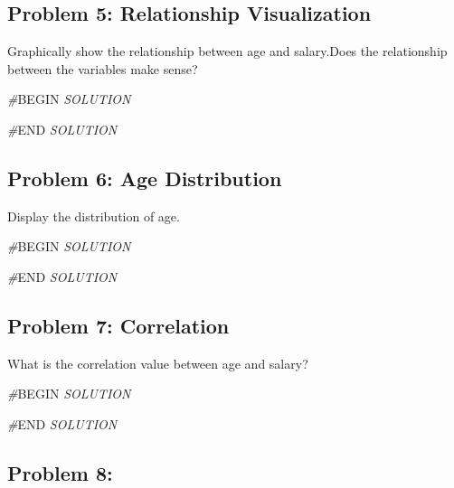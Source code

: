 \documentclass[
]{article}
\newenvironment{Shaded}{\begin{snugshade}}{\end{snugshade}}
\newcommand{\CommentTok}[1]{\textcolor[rgb]{0.56,0.35,0.01}{\textit{#1}}}
\newcommand{\RegionMarkerTok}[1]{#1}
\begin{document}
\hypertarget{problem-5-relationship-visualization}{%
\subsection{Problem 5: Relationship
Visualization}\label{problem-5-relationship-visualization}}

Graphically show the relationship between age and salary.Does the
relationship between the variables make sense?

\begin{Shaded}
\begin{Highlighting}[]
\CommentTok{\#}\RegionMarkerTok{BEGIN}\CommentTok{ SOLUTION}

\CommentTok{\#}\RegionMarkerTok{END}\CommentTok{ SOLUTION}
\end{Highlighting}
\end{Shaded}

\hypertarget{problem-6-age-distribution}{%
\subsection{Problem 6: Age
Distribution}\label{problem-6-age-distribution}}

Display the distribution of age.

\begin{Shaded}
\begin{Highlighting}[]
\CommentTok{\#}\RegionMarkerTok{BEGIN}\CommentTok{ SOLUTION}

\CommentTok{\#}\RegionMarkerTok{END}\CommentTok{ SOLUTION}
\end{Highlighting}
\end{Shaded}

\hypertarget{problem-7-correlation}{%
\subsection{Problem 7: Correlation}\label{problem-7-correlation}}

What is the correlation value between age and salary?

\begin{Shaded}
\begin{Highlighting}[]
\CommentTok{\#}\RegionMarkerTok{BEGIN}\CommentTok{ SOLUTION}

\CommentTok{\#}\RegionMarkerTok{END}\CommentTok{ SOLUTION}
\end{Highlighting}
\end{Shaded}

\hypertarget{problem-8}{%
\subsection{Problem 8:}\label{problem-8}}
\end{document}
